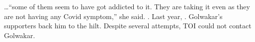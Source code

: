 \begin{refsection}
\begin{tcolorbox}[quote]
\dots{}\enquote{some of them seem to have got addicted to it. They are taking it even as they are not having any Covid symptom,} she said. . Last year, . Golwakar's supporters back him to the hilt. Despite several attempts, TOI could not contact Golwakar.\textsuperscript{\cite{urlsad09u2s}}

\end{tcolorbox}

\printbibliography[heading=subbibliography]

\end{refsection}